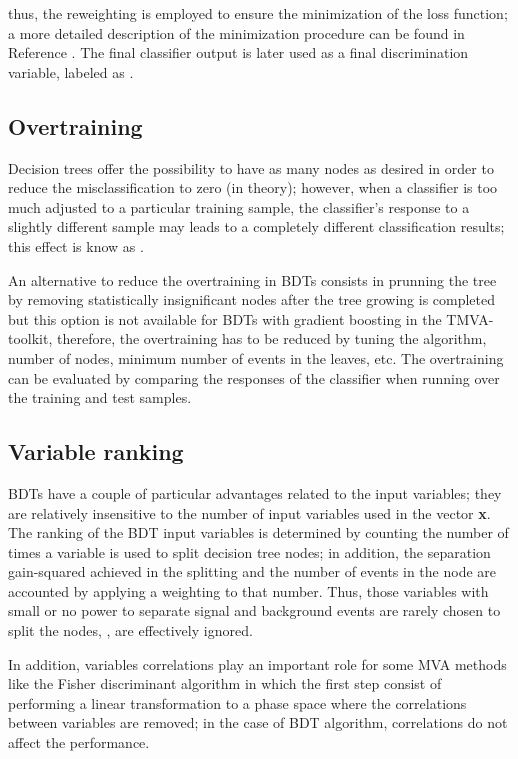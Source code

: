 \noindent thus, the reweighting is employed to ensure the minimization of the loss function; a more detailed description of the minimization procedure can be found in Reference \cite{friedman}. The final classifier output is later used as a final discrimination variable, labeled as .

\subsection{Overtraining}

Decision trees offer the possibility to have as many nodes as desired in order to reduce the misclassification to zero (in theory); however, when a classifier is too much adjusted to a particular training sample, the classifier's response to a slightly different sample may leads to a completely different classification results; this effect is know as .

An alternative to reduce the overtraining in BDTs consists in prunning the tree by removing statistically insignificant nodes after the tree growing is completed but this option is not available for BDTs with gradient boosting in the TMVA-toolkit, therefore, the overtraining has to be reduced by tuning the algorithm, number of nodes, minimum number of events in the leaves, etc. The overtraining can be evaluated by comparing the responses of the classifier when running over the training and test samples.   

\subsection{Variable ranking}

BDTs have a couple of particular advantages related to the input variables; they are relatively insensitive to the number of input variables used in the vector \textbf{x}. The ranking of the BDT input variables is determined by counting the number of times a variable is used to split decision tree nodes; in addition, the separation gain-squared achieved in the splitting and the number of events in the node are accounted by applying a weighting to that number. Thus, those variables with small or no power to separate signal and background events are rarely chosen to split the nodes, \ie, are effectively ignored.

In addition, variables correlations play an important role for some MVA methods like the Fisher discriminant algorithm in which the first step consist of performing a linear transformation to a phase space where the correlations between variables are removed; in the case of BDT algorithm, correlations do not affect the performance.

